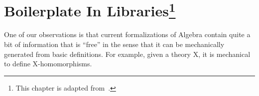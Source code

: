 \begin{comment} 
Dr. Carette's remarks: 
“formal systems community” – I have rarely heard it called that. You might want to be more precise. You only cover ITPs that use logics more expressive than FOL.
I think you’ll need to justify (and least via examples) your first sentence, if you’re going to include it at all. I would seriously consider deleting it.
3.2 focuses way too much on stuff that I’ve done. You need to diversify more!
I was expecting some actual statistics to show up here, not just examples! 
this chapter, as written has too little actual content in it. I’m pretty sure you’ve looked much deeper and harder into those libraries. I think reporting on that could be a solid, tangible contribution.
\end{comment} 

\chapter[Boilerplate In Libraries]{Boilerplate In Libraries\footnote{This chapter is adapted from~\cite{leverageCICM2020}.}}
\label{ch:redundancy}

One of our observations is that current formalizations of Algebra contain quite a
bit of information that is ``free'' in the sense that it can be
mechanically generated from basic definitions. For example, given a theory
X, it is mechanical to define X-homomorphisms. 


